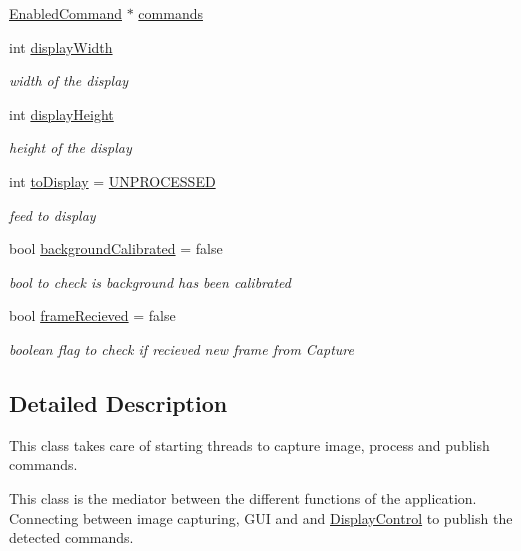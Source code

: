 \begin{DoxyCompactItemize}
\hyperlink{class_gesture_detection_1_1_enabled_command}{Enabled\+Command} $\ast$ \hyperlink{class_gestro_1_1_capture_and_detect_ad2be564539d1862efb8c8f633cc97e96}{commands}
\item 
int \hyperlink{class_gestro_1_1_capture_and_detect_a29f516e20c1196a3dbb3ab5ce52f537a}{display\+Width}
\begin{DoxyCompactList}\small\item\em width of the display \end{DoxyCompactList}\item 
int \hyperlink{class_gestro_1_1_capture_and_detect_ada094d9bbdaddd5eab331ad36939ff1f}{display\+Height}
\begin{DoxyCompactList}\small\item\em height of the display \end{DoxyCompactList}\item 
int \hyperlink{class_gestro_1_1_capture_and_detect_aa2e6f7d381e29a541356d3eff6dcb745}{to\+Display} = \hyperlink{_capture_and_detect_8h_a425a93be55e757f5e351ec9d6770c50ea93c33b647b7a4b7299c25e4e6d98ef7e}{U\+N\+P\+R\+O\+C\+E\+S\+S\+ED}
\begin{DoxyCompactList}\small\item\em feed to display \end{DoxyCompactList}\item 
bool \hyperlink{class_gestro_1_1_capture_and_detect_a7050e1a4e0bcf87954d43edb2cce6a3d}{background\+Calibrated} = false
\begin{DoxyCompactList}\small\item\em bool to check is background has been calibrated \end{DoxyCompactList}\item 
bool \hyperlink{class_gestro_1_1_capture_and_detect_a6ff36cce05c030ceda69abd88e557d88}{frame\+Recieved} = false
\begin{DoxyCompactList}\small\item\em boolean flag to check if recieved new frame from Capture \end{DoxyCompactList}\end{DoxyCompactItemize}


\subsection{Detailed Description}
This class takes care of starting threads to capture image, process and publish commands. 

This class is the mediator between the different functions of the application. Connecting between image capturing, G\+UI and and \hyperlink{class_gestro_1_1_display_control}{Display\+Control} to publish the detected commands. 

